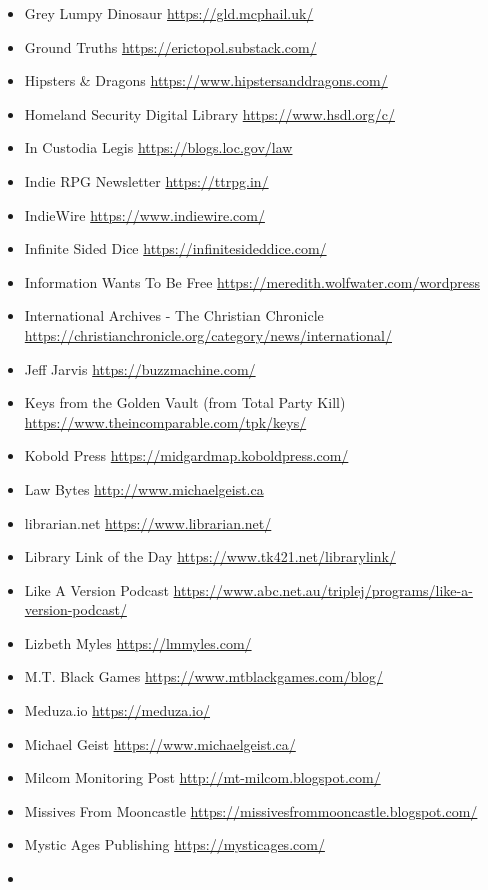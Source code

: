 \begin{itemize}
\item
  Grey Lumpy Dinosaur \url{https://gld.mcphail.uk/}
\item
  Ground Truths \url{https://erictopol.substack.com/}
\item
  Hipsters \& Dragons \url{https://www.hipstersanddragons.com/}
\item
  Homeland Security Digital Library \url{https://www.hsdl.org/c/}
\item
  In Custodia Legis \url{https://blogs.loc.gov/law}
\item
  Indie RPG Newsletter \url{https://ttrpg.in/}
\item
  IndieWire \url{https://www.indiewire.com/}
\item
  Infinite Sided Dice \url{https://infinitesideddice.com/}
\item
  Information Wants To Be Free
  \url{https://meredith.wolfwater.com/wordpress}
\item
  International Archives - The Christian Chronicle
  \url{https://christianchronicle.org/category/news/international/}
\item
  Jeff Jarvis \url{https://buzzmachine.com/}
\item
  Keys from the Golden Vault (from Total Party Kill)
  \url{https://www.theincomparable.com/tpk/keys/}
\item
  Kobold Press \url{https://midgardmap.koboldpress.com/}
\item
  Law Bytes \url{http://www.michaelgeist.ca}
\item
  librarian.net \url{https://www.librarian.net/}
\item
  Library Link of the Day \url{https://www.tk421.net/librarylink/}
\item
  Like A Version Podcast
  \url{https://www.abc.net.au/triplej/programs/like-a-version-podcast/}
\item
  Lizbeth Myles \url{https://lmmyles.com/}
\item
  M.T. Black Games \url{https://www.mtblackgames.com/blog/}
\item
  Meduza.io \url{https://meduza.io/}
\item
  Michael Geist \url{https://www.michaelgeist.ca/}
\item
  Milcom Monitoring Post \url{http://mt-milcom.blogspot.com/}
\item
  Missives From Mooncastle
  \url{https://missivesfrommooncastle.blogspot.com/}
\item
  Mystic Ages Publishing \url{https://mysticages.com/}
\item

\end{itemize}
